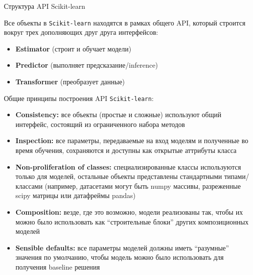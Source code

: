 \documentclass{beamer}
\begin{document}
\begin{frame}{Структура API Scikit-learn}
    \small

    Все объекты в \texttt{Scikit-learn} находятся в рамках общего API, который строится вокруг трех дополняющих друг друга интерфейсов:

    \begin{itemize}
        \scriptsize
        \item \textbf{Estimator} (строит и обучает модели)
        \item \textbf{Predictor} (выполняет предсказание/inference)
        \item \textbf{Transformer} (преобразует данные)
    \end{itemize}

    Общие принципы построения API \texttt{Scikit-learn}:
    \begin{itemize}
        \scriptsize
        \item \textbf{Consistency:} все объекты (простые и сложные) используют общий интерфейс, состоящий из ограниченного набора методов
        \item \textbf{Inspection:} все параметры, передаваемые на вход моделям и полученные во время обучения, сохраняются и доступны как открытые аттрибуты класса
        \item \textbf{Non-proliferation of classes:} специализированные классы используются только для моделей, остальные объекты представлены стандартными типами/классами (например, датасетами могут быть numpy массивы, разреженные scipy матрицы или датафреймы pandas)
        \item \textbf{Composition:} везде, где это возможно, модели реализованы так, чтобы их можно было использовать как ``строительные блоки'' других композиционных моделей
        \item \textbf{Sensible defaults:} все параметры моделей должны иметь ``разумные'' значения по умолчанию, чтобы модель можно было использовать для получения baseline решения
    \end{itemize}
\end{frame}
\end{document}
